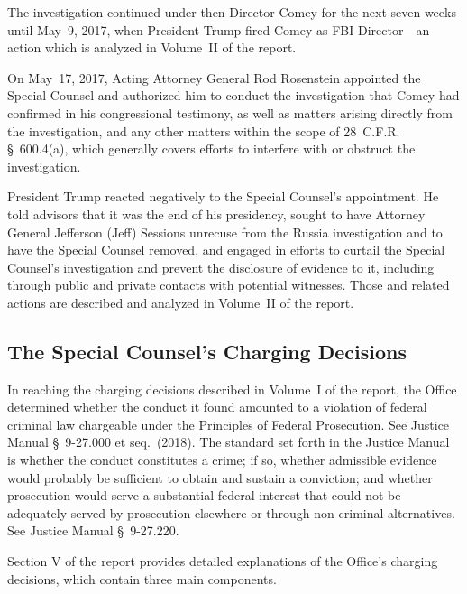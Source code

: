 The investigation continued under then-Director Comey for the next seven weeks until May~9, 2017, when President Trump fired Comey as FBI Director---an action which is analyzed in Volume~II of the report.

On May~17, 2017, Acting Attorney General Rod Rosenstein appointed the Special Counsel and authorized him to conduct the investigation that Comey had confirmed in his congressional testimony, as well as matters arising directly from the investigation, and any other matters within the scope of 28~C.F.R. \S~600.4(a), which generally covers efforts to interfere with or obstruct the investigation.

President Trump reacted negatively to the Special Counsel's appointment.
He told advisors that it was the end of his presidency, sought to have Attorney General Jefferson (Jeff) Sessions unrecuse from the Russia investigation and to have the Special Counsel removed, and engaged in efforts to curtail the Special Counsel's investigation and prevent the disclosure of evidence to it, including through public and private contacts with potential witnesses.
Those and related actions are described and analyzed in Volume~II of the report.

\hr

\subsection*{The Special Counsel's Charging Decisions}

In reaching the charging decisions described in Volume~I of the report, the Office determined whether the conduct it found amounted to a violation of federal criminal law chargeable under the Principles of Federal Prosecution.
See Justice Manual \S~9-27.000 et seq.\ (2018).
The standard set forth in the Justice Manual is whether the conduct constitutes a crime; if so, whether admissible evidence would probably be sufficient to obtain and sustain a conviction; and whether prosecution would serve a substantial federal interest that could not be adequately served by prosecution elsewhere or through non-criminal alternatives.
See Justice Manual \S~9-27.220.

Section V of the report provides detailed explanations of the Office's charging decisions, which contain three main components.


